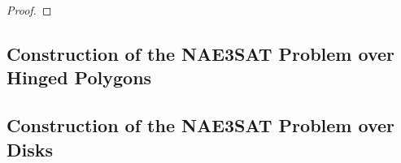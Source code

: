 \begin{proof}




\end{proof}

\subsection{Construction of the NAE3SAT Problem over Hinged Polygons}         

\subsection{Construction of the NAE3SAT Problem over Disks}
